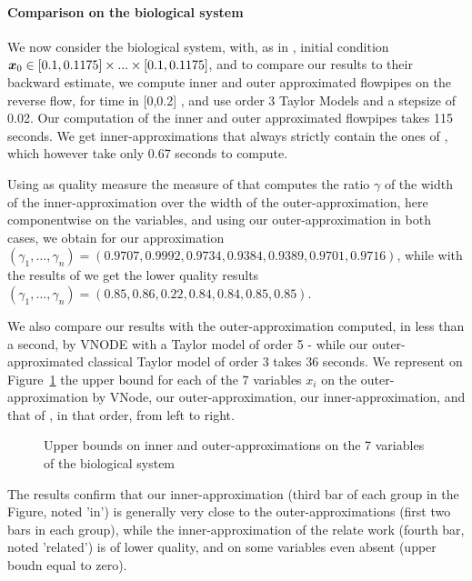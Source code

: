 \paragraph{Comparison on the biological system}
We now consider the biological system, with, as in \cite{underapprox16}, initial condition $\x_0 \in [0.1,0.1175] \times...\times [0.1,0.1175]$, 
and to compare our results to their backward estimate, we compute inner and outer approximated flowpipes on the reverse flow, 
for time in [0,0.2] , and use order 3 Taylor Models and a stepsize of 0.02. Our computation of the inner and outer approximated flowpipes takes 115 seconds. We get inner-approximations that always strictly contain the  ones of \cite{underapprox16}, which however take only 0.67 seconds to compute.

Using as quality measure the measure of  \cite{Underapproxflowpipes} that computes the ratio $\gamma$ of the width of the inner-approximation over the width of the outer-approximation, 
here componentwise on the variables, and using our outer-approximation in both cases, we obtain for our approximation
$(\gamma_1,\ldots,\gamma_n)=(0.9707,   0.9992,   0.9734,   0.9384,   0.9389,   0.9701,   0.9716)$, 
while with the results of \cite{underapprox16} we get the lower quality results
$(\gamma_1,\ldots,\gamma_n)=( 0.85,   0.86,   0.22,   0.84 ,  0.84 ,  0.85,   0.85)$.

We also compare our results with the outer-approximation computed, in less than a second, by VNODE with a Taylor model of order 5 - while our outer-approximated classical Taylor model of order 3 
takes 36 seconds. We represent on Figure~\ref{fig:histo} the upper bound for each of the 7 variables $x_i$ on the outer-approximation by VNode,  
our outer-approximation, our inner-approximation, and that of \cite{underapprox16}, in that order, from left to right.
\begin{figure}[htbp]
\begin{center}
\end{center}
\caption{Upper bounds on inner and outer-approximations on the 7 variables of the biological system \label{fig:histo}}
\end{figure}
The results confirm that our inner-approximation (third bar of each group in the Figure, noted 'in') is generally very close to the outer-approximations (first two bars in each group),
while the inner-approximation of the relate work (fourth bar, noted 'related') is of lower quality, and on some variables even absent (upper boudn equal to zero).

